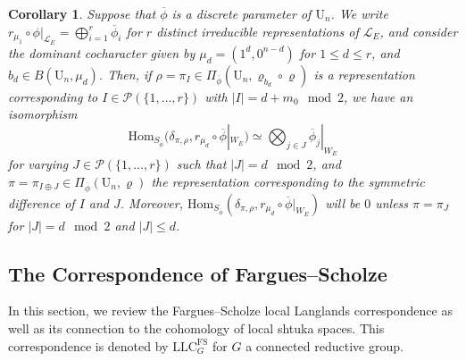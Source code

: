 \documentclass[reqno,11pt]{amsart}
\newtheorem{corollary}[theorem]{Corollary}
\theoremstyle{remark}
\newcommand{\U}{\mathrm{U}}
\newcommand{\mc}{\mathcal}
\newcommand{\ov}{\overline}
\newcommand{\LLC}{\mathrm{LLC}}
\begin{document}
\begin{corollary}{\label{Unextmucor}}
Suppose that $\ov{\phi}$ is a discrete parameter of $\U_{n}$. We write $r_{\mu_{1}} \circ \phi|_{\mathcal{L}_{E}} = \bigoplus_{i = 1}^{r} \ov{\phi}_{i}$ for $r$ distinct irreducible representations of $\mathcal{L}_{E}$, and consider the dominant cocharacter given by $\mu_{d} = (1^{d},0^{n - d})$ for $1 \leq d \leq r$, and $b_d \in B(\U_n,\mu_{d})$. Then, if $\rho = \pi_{I} \in \Pi_{\ov{\phi}}(\U_{n},\varrho_{b_d} \circ \varrho)$ is a representation corresponding to $I \in \mc{P}(\{1,\ldots,r\})$ with $|I|=d +m_0 \mod 2$, we have an isomorphism 
\[ \mathrm{Hom}_{S_{\ov{\phi}}}(\delta_{\pi,\rho},r_{\mu_{d}} \circ \ov{\phi}|_{W_{E}}) \simeq \bigotimes_{j \in J} \ov{\phi}_{j}|_{W_{E}}  \]
for varying $J \in \mc{P}(\{1, \dots, r\})$ such that $|J| = d \mod 2$, and $\pi = \pi_{I \oplus J} \in \Pi_{\ov{\phi}}(\U_{n},\varrho)$ the representation corresponding to the symmetric difference of $I$ and $J$. Moreover, $\mathrm{Hom}_{S_{\ov{\phi}}}(\delta_{\pi,\rho},r_{\mu_{d}} \circ \ov{\phi}|_{W_{E}})$ will be $0$ unless $\pi = \pi_{J}$ for $|J| = d \mod 2$ and $|J| \leq d$. 
\end{corollary}
\subsection{The Correspondence of Fargues--Scholze}    
In this section, we review the Fargues--Scholze local Langlands correspondence as well as its connection to the cohomology of local shtuka spaces. This correspondence is denoted by $\LLC^{\mathrm{FS}}_G$ for $G$ a connected reductive group.
\end{document}
